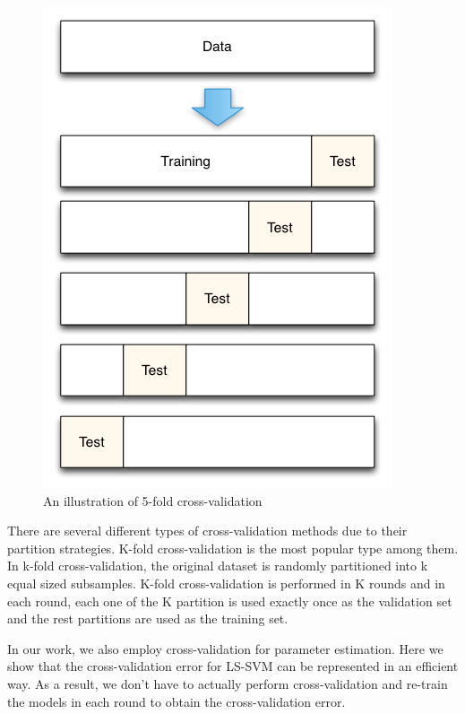 \begin{figure}
	\centering
	\includegraphics[scale=.4]{transfer/fig/cv.png}
	\caption{An illustration of 5-fold cross-validation}
\end{figure}
There are several different types of cross-validation methods due to their partition strategies. K-fold cross-validation is the most popular type among them. In k-fold cross-validation, the original dataset is randomly partitioned into k equal sized subsamples. K-fold cross-validation is performed in K rounds and in each round, each one of the K partition is used exactly once as the validation set and the rest partitions are used as the training set. 

In our work, we also employ cross-validation for parameter estimation. Here we show that the cross-validation error for LS-SVM can be represented in an efficient way. As a result, we don't have to actually perform cross-validation and re-train the models in each round to obtain the cross-validation error.

